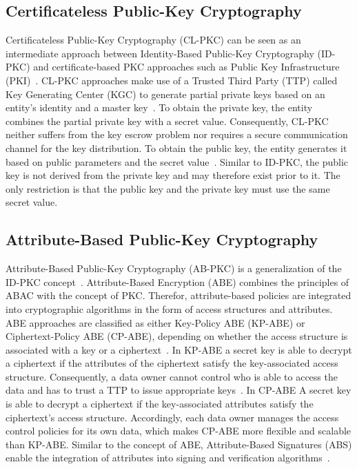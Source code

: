 \subsection{Certificateless Public-Key Cryptography}
Certificateless Public-Key Cryptography (CL-PKC) can be seen as an intermediate approach between Identity-Based Public-Key Cryptography (ID-PKC) and certificate-based PKC approaches such as Public Key Infrastructure (PKI)~\cite{AlRiyami2003}.
CL-PKC approaches make use of a Trusted Third Party (TTP) called Key Generating Center (KGC) to generate partial private keys based on an entity's identity and a master key~\cite{AlRiyami2003}.
To obtain the private key, the entity combines the partial private key with a secret value.
Consequently, CL-PKC neither suffers from the key escrow problem nor requires a secure communication channel for the key distribution.
To obtain the public key, the entity generates it based on public parameters and the secret value~\cite{AlRiyami2003}.
Similar to ID-PKC, the public key is not derived from the private key and may therefore exist prior to it.
The only restriction is that the public key and the private key must use the same secret value.

\subsection{Attribute-Based Public-Key Cryptography}
Attribute-Based Public-Key Cryptography (AB-PKC) is a generalization of the ID-PKC concept~\cite{Sahai2005,Goyal2006,Hu2023}.
Attribute-Based Encryption (ABE) combines the principles of ABAC with the concept of PKC.
Therefor, attribute-based policies are integrated into cryptographic algorithms in the form of access structures and attributes.
ABE approaches are classified as either Key-Policy ABE (KP-ABE) or Ciphertext-Policy ABE (CP-ABE), depending on whether the access structure is associated with a key or a ciphertext~\cite{Goyal2006,Bethencourt2007,Hu2023}.
In KP-ABE a secret key is able to decrypt a ciphertext if the attributes of the ciphertext satisfy the key-associated access structure.
Consequently, a data owner cannot control who is able to access the data and has to trust a TTP to issue appropriate keys~\cite{Bethencourt2007}.
In CP-ABE A secret key is able to decrypt a ciphertext if the key-associated attributes satisfy the ciphertext's access structure.
Accordingly, each data owner manages the access control policies for its own data, which makes CP-ABE more flexible and scalable than KP-ABE.
Similar to the concept of ABE, Attribute-Based Signatures (ABS) enable the integration of attributes into signing and verification algorithms~\cite{Li2010,Maji2011}.
